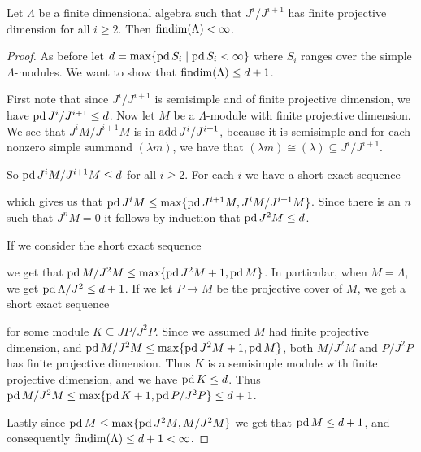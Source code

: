 \begin{theorem}\cite[Theorem~3.1]{Moc65}
	Let $\Lambda$ be a finite dimensional algebra such that $J^i/J^{i+1}$ has finite projective dimension for all $i \geq 2$. Then $\operatorname{findim}(\Lambda) < \infty$.
	\begin{proof}
		As before let $d = \max\{\operatorname{pd} S_i \mid \operatorname{pd} S_i < \infty\}$ where $S_i$ ranges over the simple $\Lambda$-modules. We want to show that $\operatorname{findim}(\Lambda) \leq d+1$.

		First note that since $J^i/J^{i+1}$ is semisimple and of finite projective dimension, we have $\operatorname{pd} J^i/J^{i+1} \leq d$. Now let $M$ be a $\Lambda$-module with finite projective dimension. We see that $J^iM/J^{i+1}M$ is in $\operatorname{add} J^i/J^{i+1}$, because it is semisimple and for each nonzero simple summand $(\lambda m)$, we have that $(\lambda m) \cong (\lambda) \subseteq J^i/J^{i+1}$.

		So $\operatorname{pd} J^iM/J^{i+1}M \leq d$ for all $i\geq 2$. For each $i$ we have a short exact sequence
		\begin{center}
		\end{center}
		which gives us that $\operatorname{pd} J^i M \leq \max\{ \operatorname{pd} J^{i+1}M, J^iM/J^{i+1}M \}$. Since there is an $n$ such that $J^n M = 0$ it follows by induction that $\operatorname{pd} J^2M \leq d$.

		If we consider the short exact sequence
		\begin{center}
		\end{center}
		we get that $\operatorname{pd} M/J^2M \leq \max\{\operatorname{pd} J^2M+1, \operatorname{pd} M\}$. In particular, when $M=\Lambda$, we get $\operatorname{pd} \Lambda/J^2 \leq d+1$. If we let $P \to M$ be the projective cover of $M$, we get a short exact sequence
		\begin{center}
		\end{center}
		for some module $K \subseteq JP/J^2P$. Since we assumed $M$ had finite projective dimension, and $\operatorname{pd} M/J^2M \leq \max\{\operatorname{pd} J^2M+1, \operatorname{pd} M\}$, both $M/J^2M$ and $P/J^2P$ has finite projective dimension. Thus $K$ is a semisimple module with finite projective dimension, and we have $\operatorname{pd} K \leq d$. Thus $\operatorname{pd} M/J^2M \leq \max\{\operatorname{pd} K + 1, \operatorname{pd} P/J^2P\} \leq d+1$.

		Lastly since $\operatorname{pd} M \leq \max\{\operatorname{pd} J^2M, M/J^2M\}$ we get that $\operatorname{pd} M \leq d+1$, and consequently $\operatorname{findim}(\Lambda) \leq d+1 < \infty$.
	\end{proof}
\end{theorem}


